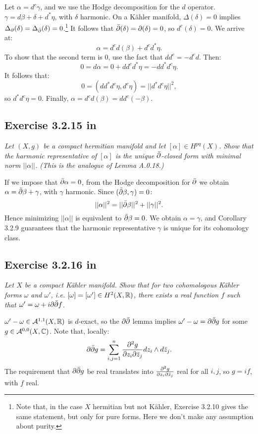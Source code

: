 \documentclass{article}
\begin{document}
Let $\alpha = d^c \gamma$, and we use the Hodge decomposition for the $d$ operator. $\gamma = d\beta + \delta + d^*\eta$,
with $\delta$ harmonic. On a K\"{a}hler manifold, $\Delta (\delta) = 0$ implies $\Delta_{\partial}(\delta) = \Delta_{\bar {\partial}}
(\delta) = 0$.\footnote{Note that, in the case $X$ hermitian but not K\"{a}hler, Exercise 3.2.10 gives the same
statement, but only for pure forms. Here we don't make any assumption about purity.} It follows that $\bar {\partial}(\delta)
= \partial(\delta) = 0$, so $d^c(\delta) = 0$. We arrive at:
\[	\alpha = d^c d(\beta) + d^cd^*\eta.	\]
To show that the second term is 0, use the fact that $dd^c = -d^cd$. Then:
\[	0 = d\alpha = 0 + dd^c d^*\eta = - dd^*d^c \eta.	\]
It follows that:
\[	0 = (dd^*d^c \eta, d^c \eta) = ||d^*d^c \eta||^2,	\]
so $d^*d^c \eta = 0$. Finally, $\alpha = d^cd(\beta) = dd^c(-\beta)$.


\subsection*{Exercise 3.2.15 in \cite{Huy}}
\emph{Let $(X,g)$ be a compact hermitian manifold and let $[\alpha] \in H^{pq}(X)$. Show
that the harmonic representative of $[\alpha]$ is the unique $\bar {\partial}$-closed form with minimal
norm $||\alpha||$. (This is the analogue of Lemma A.0.18.)}
\vspace{3mm}

If we impose that $\bar {\partial} \alpha = 0$, from the Hodge decomposition for $\bar {\partial}$ we obtain $\alpha = \bar {\partial} \beta
+ \gamma$, with $\gamma$ harmonic. Since $(\bar {\partial} \beta, \gamma) = 0$:
\[	||\alpha||^2 = ||\bar {\partial} \beta||^2 + ||\gamma||^2.	\]
Hence minimizing $||\alpha||$ is equivalent to $\bar {\partial} \beta = 0$. We obtain $\alpha = \gamma$, and Corollary 3.2.9
guarantees that the harmonic representative $\gamma$ is unique for its cohomology class.


\subsection*{Exercise 3.2.16 in \cite{Huy}}
\emph{Let $X$ be a compact K\"{a}hler manifold. Show that for two cohomologous
K\"{a}hler forms $\omega$ and $\omega'$, i.e. $[\omega] = [\omega'] \in H^2(X, \mathbb{R})$, there exists a real function $f$ such
that $\omega' = \omega + i\partial \bar{\partial} f$.}
\vspace{3mm}

$\omega' - \omega \in \mathcal{A}^{1,1}(X,\mathbb{R})$ is $d$-exact, so the $\partial \bar {\partial}$ lemma implies $\omega' - \omega
= \partial \bar {\partial} g$ for some $g \in \mathcal{A}^{0,0}(X,\mathbb{C})$. Note that, locally:
\[	\partial \bar {\partial} g = \sum_{i,j = 1}^n \frac{\partial^2 g}{\partial z_i \partial \bar z_j} dz_i \wedge d\bar z_j.	\]
The requirement that $\partial \bar {\partial} g$ be real translates into $\frac{\partial^2 g}{\partial z_i \partial \bar z_j}$ real for all $i,j$, so
$g=if$, with $f$ real.
\end{document}
